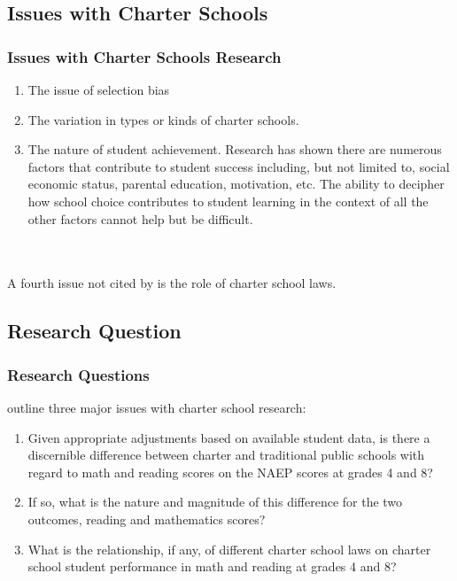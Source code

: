 \documentclass[10pt,handout,mathserif]{beamer}
\begin{document}
\subsection{Issues with Charter Schools}

\begin{frame}[c]
	\frametitle{Issues with Charter Schools Research}
	\begin{enumerate}[<+-| alert@+>]
	    \setlength{\itemsep}{15pt}
		\item The issue of selection bias
		\item The variation in types or kinds of charter schools.
		\item The nature of student achievement. Research has shown there are numerous factors that contribute to student success including, but not limited to, social economic status, parental education, motivation, etc. The ability to decipher how school choice contributes to student learning in the context of all the other factors cannot help but be difficult.
	\end{enumerate}
	\ \\\ \\
	\pause
	A fourth issue not cited by  is the role of charter school laws.
\end{frame}

\subsection{Research Question}

\begin{frame}[c]
	\frametitle{Research Questions}
	 outline three major issues with charter school research:
	\begin{enumerate}[<+-| alert@+>]
    \setlength{\itemsep}{15pt}
	\item Given appropriate adjustments based on available student data, is there a discernible difference between charter and traditional public schools with regard to math and reading scores on the NAEP scores at grades 4 and 8?
    \item If so, what is the nature and magnitude of this difference for the two outcomes, reading and mathematics scores?
    \item What is the relationship, if any, of different charter school laws on charter school student performance in math and reading at grades 4 and 8?
	\end{enumerate}
\end{frame}
\end{document}
